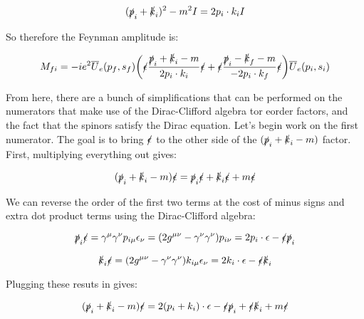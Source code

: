 \documentclass[a4]{article}
\begin{document}
    \begin{equation}
        (\slashed{p}_i + \slashed{k}_i)^2 - m^2 I =  2 p_i \cdot k_i I
    \end{equation}

    So therefore the Feynman amplitude is:

    \begin{equation}
        M_{fi} = - i e^2 \overline{U}_e (p_f, s_f) \bigg( \slashed{\epsilon} \frac{\slashed{p}_i + \slashed{k}_i - m}{2 p_i \cdot k_i} \slashed{\epsilon} + \slashed{\epsilon} \frac{\slashed{p}_i - \slashed{k}_f - m}{- 2 p_i \cdot k_f} \slashed{\epsilon} \bigg) \overline{U}_e (p_i, s_i)
    \end{equation}

    From here, there are a bunch of simplifications that can be performed on the numerators that make use of the Dirac-Clifford algebra tor eorder factors, and the fact that the spinors satisfy
    the Dirac equation. Let's begin work on the first numerator. The goal is to bring $\slashed{\epsilon}$ to the other side of the $(\slashed{p}_i + \slashed{k}_i - m)$ factor. First, multiplying
    everything out gives:

    \begin{equation}
        (\slashed{p}_i + \slashed{k}_i - m) \slashed{\epsilon} = \slashed{p}_i \slashed{\epsilon} + \slashed{k}_i \slashed{\epsilon} + m \slashed{\epsilon}
    \end{equation}

    We can reverse the order of the first two terms at the cost of minus signs and extra dot product terms using the Dirac-Clifford algebra:

    \begin{equation}
        \slashed{p}_i \slashed{\epsilon} = \gamma^{\mu} \gamma^{\nu} p_{i \mu} \epsilon_{\nu} = (2 g^{\mu \nu} - \gamma^\nu \gamma^\nu) p_{i \nu} = 2 p_i \cdot \epsilon - \slashed{\epsilon} \slashed{p}_i
    \end{equation}
    
    \begin{equation}
        \slashed{k}_i \slashed{\epsilon} = (2 g^{\mu \nu} - \gamma^\nu \gamma^\nu) k_{i \mu} \epsilon_\nu = 2 k_i \cdot \epsilon - \slashed{\epsilon} \slashed{k}_i
    \end{equation}

    Plugging these resuts in gives:

    \begin{equation}
        (\slashed{p}_i + \slashed{k}_i - m) \slashed{\epsilon} = 2 (p_i + k_i) \cdot \epsilon - \slashed{\epsilon} \slashed{p}_i + \slashed{\epsilon} \slashed{k}_i + m \slashed{\epsilon}
    \end{equation}
\end{document}

